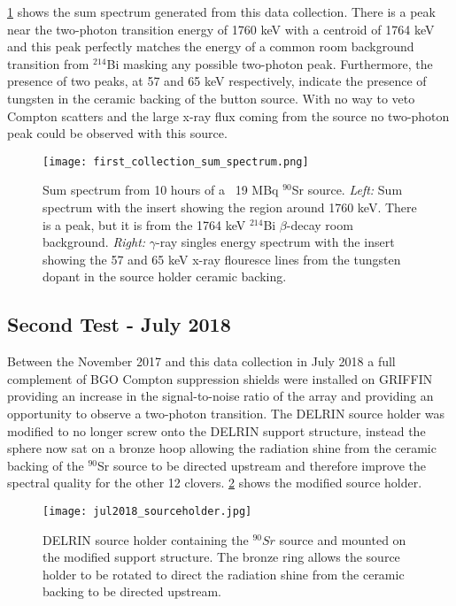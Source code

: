 \documentclass[cnatzke_thesis_proposal.tex]{subfiles}
\begin{document}
\ref{fig:sum_spectrum_jul2017} shows the sum spectrum generated from this data collection.
There is a peak near the two-photon transition energy of 1760 keV with a centroid of 1764 keV and this peak perfectly matches the energy of a common room background transition from $^{214}$Bi masking any possible two-photon peak.
Furthermore, the presence of two peaks, at 57 and 65 keV respectively, indicate the presence of tungsten in the ceramic backing of the button source.
With no way to veto Compton scatters and the large x-ray flux coming from the source no two-photon peak could be observed with this source.

\begin{figure}[htbp]
  \centering
  \texttt{[image: first\_collection\_sum\_spectrum.png]}
  \caption{Sum spectrum from 10 hours of a ~19 MBq $^{90}$Sr source.
    \textit{Left:} Sum spectrum with the insert showing the region around 1760 keV. There is a peak, but it is from the 1764 keV $^{214}$Bi $\beta$-decay room background.
    \textit{Right:} $\gamma$-ray singles energy spectrum with the insert showing the 57 and 65 keV x-ray flouresce lines from the tungsten dopant in the source holder ceramic backing.
  }
  \label{fig:sum_spectrum_jul2017}
\end{figure}

\subsection{Second Test - July 2018}
Between the November 2017 and this data collection in July 2018 a full complement of BGO Compton suppression shields were installed on GRIFFIN providing an increase in the signal-to-noise ratio of the array and providing an opportunity to observe a two-photon transition.
The DELRIN source holder was modified to no longer screw onto the DELRIN support structure, instead the sphere now sat on a bronze hoop allowing the radiation shine from the ceramic backing of the $^{90}$Sr source to be directed upstream and therefore improve the spectral quality for the other 12 clovers.
\ref{fig:source_holder_jul2018} shows the modified source holder.

\begin{figure}[htbp]
  \centering
  \texttt{[image: jul2018\_sourceholder.jpg]}
  \caption{DELRIN source holder containing the $^{90}Sr$ source and mounted on the modified support structure. The bronze ring allows the source holder to be rotated to direct the radiation shine from the ceramic backing to be directed upstream.}
  \label{fig:source_holder_jul2018}
\end{figure}
\end{document}
